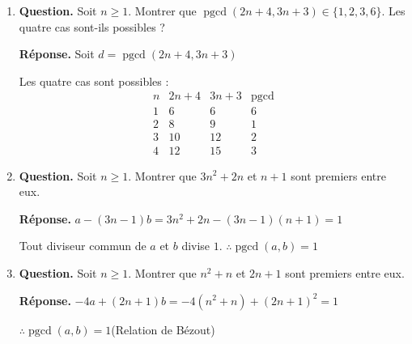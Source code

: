 \documentclass[12pt, a4paper]{article}
\begin{document}
\begin{enumerate}[label=2.\arabic*., start=17]
  \item \begin{minipage}[t]{\linewidth}\raggedright
\textbf{Question.} Soit $n\geq1$. Montrer que $\operatorname{pgcd}(2n+4,3n+3)\in\{1,2,3,6\}$. Les quatre cas sont-ils possibles ?
\par\smallskip
\textbf{Réponse.} Soit $d = \operatorname{pgcd}(2n+4, 3n+3)$
    Les quatre cas sont possibles :
    \[
      \begin{array}{c|c|c|c}
        n & 2n+4 & 3n+3 & \operatorname{pgcd}\\ \hline
        1 & 6 & 6 & 6\\
        2 & 8 & 9 & 1\\
        3 & 10 & 12 & 2\\
        4 & 12 & 15 & 3
      \end{array}
    \]
\end{minipage}

  \item \begin{minipage}[t]{\linewidth}\raggedright
\textbf{Question.} Soit $n\geq1$. Montrer que $3n^2+2n$ et $n+1$ sont premiers entre eux.
\par\smallskip
\textbf{Réponse.} $a - (3n-1)b = 3n^2 + 2n - (3n-1)(n+1) = 1$

    Tout diviseur commun de $a$ et $b$ divise $1$.
    $\therefore \operatorname{pgcd}(a,b) = 1$
\end{minipage}

  \item \begin{minipage}[t]{\linewidth}\raggedright
\textbf{Question.} Soit $n\geq1$. Montrer que $n^2+n$ et $2n+1$ sont premiers entre eux.
\par\smallskip
\textbf{Réponse.} $-4a + (2n+1)b = -4(n^2+n) + (2n+1)^2 = 1$

    $\therefore \operatorname{pgcd}(a,b) = 1$\hfill(Relation de Bézout)
\end{minipage}


\end{enumerate}
\end{document}
